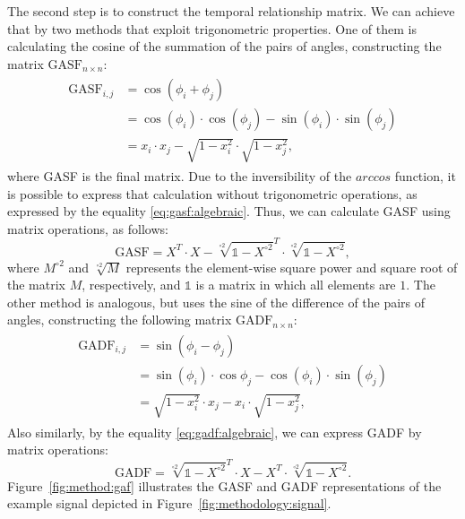 \documentclass[final,3p,times,twocolumn]{elsarticle}
\begin{document}
The second step is to construct the temporal relationship matrix. We can achieve that by two methods that exploit trigonometric properties. One of them is calculating the cosine of the summation of the pairs of angles, constructing the matrix $\text{GASF}_{n \times n}$:
\begin{align}
\begin{split}
    \text{GASF}_{i,j}     & = \cos(\phi_i + \phi_j) \\
            & = \cos(\phi_i) \cdot \cos(\phi_j) - \sin(\phi_i) \cdot \sin(\phi_j) \\
            & = x_i \cdot x_j - \sqrt{1 - x_i^2} \cdot \sqrt{1 - x_j^2}, \label{eq:gasf:algebraic}
\end{split}
\end{align}
where \gls{GASF} is the final matrix. Due to the inversibility of the $arccos$ function, it is possible to express that calculation without trigonometric operations, as expressed by the equality \ref{eq:gasf:algebraic}. Thus, we can calculate \gls{GASF} using matrix operations, as follows:  
\begin{equation}
    \text{GASF} = X^T \cdot X - \sqrt[\circ 2]{\mathds{1}-X^{\circ 2}}^T \cdot \sqrt[\circ 2]{\mathds{1}-X^{\circ 2}},
\end{equation}
where $M^{\circ 2}$ and $\sqrt[\circ 2]{M}$ represents the element-wise square power and square root of the matrix $M$, respectively, and $\mathds{1}$ is a matrix in which all elements are $1$. The other method is analogous, but uses the sine of the difference of the pairs of angles, constructing the following matrix $\text{GADF}_{n \times n}$:
\begin{align}
\begin{split}
    \text{GADF}_{i,j} & = \sin(\phi_i - \phi_j) \\
        & = \sin(\phi_i) \cdot \cos{\phi_j} - \cos(\phi_i) \cdot \sin(\phi_j) \\
        & = \sqrt{1 - x_i^2} \cdot x_j - x_i \cdot \sqrt{1 - x_j^2},  \label{eq:gadf:algebraic}
\end{split}
\end{align}
Also similarly, by the equality \ref{eq:gadf:algebraic}, we can express \gls{GADF} by matrix operations:
\begin{equation}
    \text{GADF} = \sqrt[\circ 2]{\mathds{1} - X^{\circ 2}}^T \cdot X - X^T \cdot \sqrt[\circ 2]{\mathds{1} - X^{\circ 2}}.
\end{equation}
Figure~\ref{fig:method:gaf} illustrates the \gls{GASF} and \gls{GADF} representations of the example signal depicted in Figure~\ref{fig:methodology:signal}.
\end{document}
